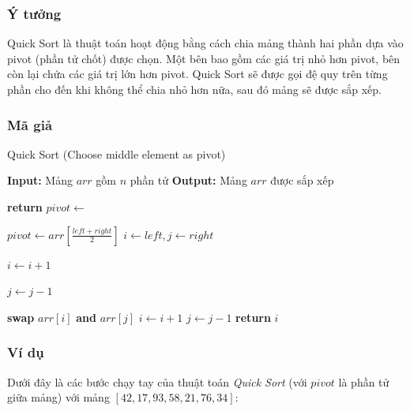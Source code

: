 \subsubsection{Ý tưởng}
Quick Sort là thuật toán hoạt động bằng cách chia mảng thành hai phần dựa vào pivot (phần tử chốt) được chọn. Một bên bao gồm các giá trị nhỏ hơn pivot, bên còn lại chứa các giá trị lớn hơn pivot. Quick Sort sẽ được gọi đệ quy trên từng phần cho đến khi không thể chia nhỏ hơn nữa, sau đó mảng sẽ được sắp xếp.\cite{fasha2021comparative}

\subsubsection{Mã giả}
\begin{algorithm}[H]
\caption{Quick Sort (Choose middle element as pivot)}
\begin{algorithmic}[1]
    \State \textbf{Input:} Mảng $arr$ gồm $n$ phần tử
    \State \textbf{Output:} Mảng $arr$ được sắp xếp
    \State {}
\EndProcedure

        \State \textbf{return}
    \EndIf
    \State $pivot \gets$ 
    \State {}
    \State {}
\EndProcedure

    \State $pivot \gets arr[\frac{left + right}{2}]$
    \State $i \gets left, j \gets right$

            \State $i \gets i + 1$
        \EndWhile
    
            \State $j \gets j - 1$
        \EndWhile
    
            \State \textbf{swap} $arr[i]$ \textbf{and} $arr[j]$
            \State $i \gets i + 1$
            \State $j \gets j - 1$
        \EndIf
    \EndWhile
    \State \textbf{return} $i$
\EndProcedure
\end{algorithmic}
\end{algorithm}

\subsubsection{Ví dụ}
Dưới đây là các bước chạy tay của thuật toán \textit{Quick Sort} (với $pivot$ là phần tử giữa mảng) với mảng $[42, 17, 93, 58, 21, 76, 34]$:

